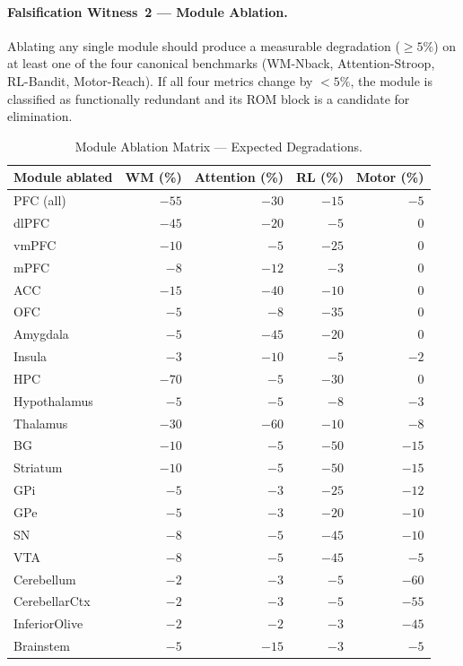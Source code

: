 \paragraph{Falsification Witness~2 — Module Ablation.}
Ablating any single module should produce a measurable degradation (${\geq}5\%$)
on at least one of the four canonical benchmarks (WM-Nback, Attention-Stroop,
RL-Bandit, Motor-Reach).  If all four metrics change by $<5\%$, the module is
classified as functionally redundant and its ROM block is a candidate for
elimination.

\begin{table}[htbp]
\centering
\caption{Module Ablation Matrix — Expected Degradations.}
\label{tab:flos73-ablation}
\small
\begin{tabular}{lrrrr}
\toprule
Module ablated & WM (\%) & Attention (\%) & RL (\%) & Motor (\%) \\
\midrule
PFC (all)       & $-55$ & $-30$ & $-15$ & $-5$  \\
dlPFC           & $-45$ & $-20$ & $-5$  & $0$   \\
vmPFC           & $-10$ & $-5$  & $-25$ & $0$   \\
mPFC            & $-8$  & $-12$ & $-3$  & $0$   \\
ACC             & $-15$ & $-40$ & $-10$ & $0$   \\
OFC             & $-5$  & $-8$  & $-35$ & $0$   \\
Amygdala        & $-5$  & $-45$ & $-20$ & $0$   \\
Insula          & $-3$  & $-10$ & $-5$  & $-2$  \\
HPC             & $-70$ & $-5$  & $-30$ & $0$   \\
Hypothalamus    & $-5$  & $-5$  & $-8$  & $-3$  \\
Thalamus        & $-30$ & $-60$ & $-10$ & $-8$  \\
BG              & $-10$ & $-5$  & $-50$ & $-15$ \\
Striatum        & $-10$ & $-5$  & $-50$ & $-15$ \\
GPi             & $-5$  & $-3$  & $-25$ & $-12$ \\
GPe             & $-5$  & $-3$  & $-20$ & $-10$ \\
SN              & $-8$  & $-5$  & $-45$ & $-10$ \\
VTA             & $-8$  & $-5$  & $-45$ & $-5$  \\
Cerebellum      & $-2$  & $-3$  & $-5$  & $-60$ \\
CerebellarCtx   & $-2$  & $-3$  & $-5$  & $-55$ \\
InferiorOlive   & $-2$  & $-2$  & $-3$  & $-45$ \\
Brainstem       & $-5$  & $-15$ & $-3$  & $-5$  \\
\bottomrule
\end{tabular}
\end{table}

